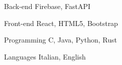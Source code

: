 

\begin{cvskills}


  \cvskill
    {Back-end} %
    {Firebase, FastAPI} %

  \cvskill
    {Front-end} %
    {React, HTML5, Bootstrap} %

  \cvskill
    {Programming} %
    {C, Java, Python, Rust} %

  \cvskill
    {Languages} %
    {Italian, English} %

\end{cvskills}

